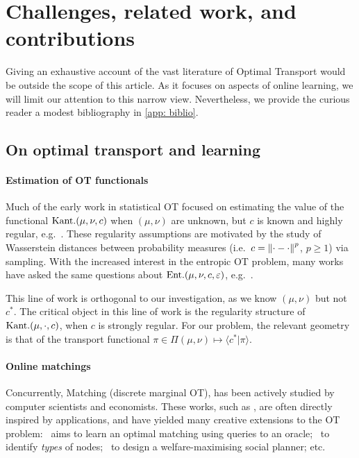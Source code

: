 
\section{Challenges, related work, and contributions}\label{sec:RWCC}
Giving an exhaustive account of the vast literature of Optimal Transport would be outside the scope of this article. As it focuses on aspects of online learning, we will limit our attention to this narrow view. Nevertheless, we provide the curious reader a modest bibliography in \cref{app: biblio}.

\subsection{On optimal transport and learning}\label{subsec: OT and learning RW}
        \paragraph{Estimation of OT functionals}
        Much of the early work in statistical OT focused on estimating the value of the functional $\text{Kant.}(\mu,\nu,c)$ when $(\mu,\nu)$ are unknown, but $c$ is known and highly regular, e.g.\ \citep{horowitz_mean_1994,weed_sharp_2019}. These regularity assumptions are motivated by the study of Wasserstein distances between probability measures (i.e.\ $c=\left\lVert\cdot-\cdot\right\rVert^p$, $p\ge1$) via sampling. With the increased interest in the entropic OT problem, many works have asked the same questions about $\text{Ent.}(\mu,\nu,c,\varepsilon)$, e.g.\ \citep{rigollet_sample_2022,stromme_minimum_2024}.   

        This line of work is orthogonal to our investigation, as we know $(\mu,\nu)$ but not $c^*$. The critical object in this line of work is the regularity structure of $\text{Kant.}(\mu,\cdot,c)$, when $c$ is strongly regular. For our problem, the relevant geometry is that of the transport functional $\pi\in\Pi(\mu,\nu)\mapsto \langle c^*\vert \pi\rangle$.

        \paragraph{Online matchings}
        Concurrently, Matching (discrete marginal OT), has been actively studied by computer scientists and economists. These works, such as \citep{perrot_mapping_2016}, are often directly inspired by applications, and have yielded many creative extensions to the OT problem:~\cite{alon_learning_2004} aims to learn an optimal matching using queries to an oracle;~\cite{johari_matching_2021} to identify \emph{types} of nodes;~\cite{min_learn_2022} to design a welfare-maximising social planner; etc.

